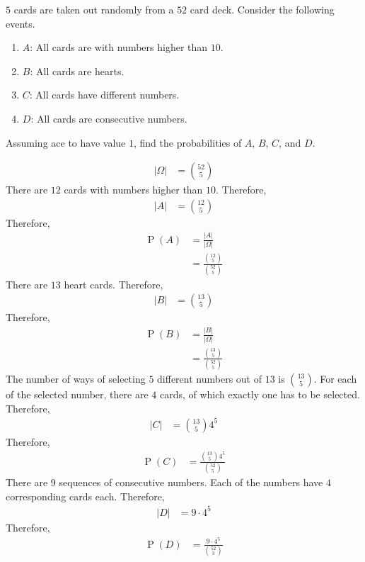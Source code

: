 \documentclass[titlepage, fleqn, a4paper, 12pt, twoside]{article}
\theoremstyle{definition}
\theoremstyle{theorem}
\DeclareMathOperator{\prob}{\mathrm{P}}
\begin{document}
\begin{question}
	$5$ cards are taken out randomly from a $52$ card deck.
	Consider the following events.
	\begin{enumerate}
		\item $A$: All cards are with numbers higher than $10$.
		\item $B$: All cards are hearts.
		\item $C$: All cards have different numbers.
		\item $D$: All cards are consecutive numbers.
	\end{enumerate}
	Assuming ace to have value $1$, find the probabilities of $A$, $B$, $C$, and $D$.
\end{question}

\begin{solution}
	\begin{align*}
		|\Omega| & = \binom{52}{5}
	\end{align*}
	There are $12$ cards with numbers higher than $10$.
	Therefore,
	\begin{align*}
		|A| & = \binom{12}{5}
	\end{align*}
	Therefore,
	\begin{align*}
		\prob(A) & = \frac{|A|}{|\Omega|} \\
                         & = \frac{\binom{12}{5}}{\binom{52}{5}}
	\end{align*}
	There are $13$ heart cards.
	Therefore,
	\begin{align*}
		|B| & = \binom{13}{5}
	\end{align*}
	Therefore,
	\begin{align*}
		\prob(B) & = \frac{|B|}{|\Omega|} \\
                         & = \frac{\binom{13}{5}}{\binom{52}{5}}
	\end{align*}
	The number of ways of selecting $5$ different numbers out of $13$ is $\binom{13}{5}$.
	For each of the selected number, there are $4$ cards, of which exactly one has to be selected.
	Therefore,
	\begin{align*}
		|C| & = \binom{13}{5} 4^5
	\end{align*}
	Therefore,
	\begin{align*}
		\prob(C) & = \frac{\binom{13}{5} 4^5}{\binom{52}{5}}
	\end{align*}
	There are $9$ sequences of consecutive numbers.
	Each of the numbers have $4$ corresponding cards each.
	Therefore,
	\begin{align*}
		|D| & = 9 \cdot 4^5
	\end{align*}
	Therefore,
	\begin{align*}
		\prob(D) & = \frac{9 \cdot 4^5}{\binom{52}{3}}
	\end{align*}
\end{solution}
\end{document}
